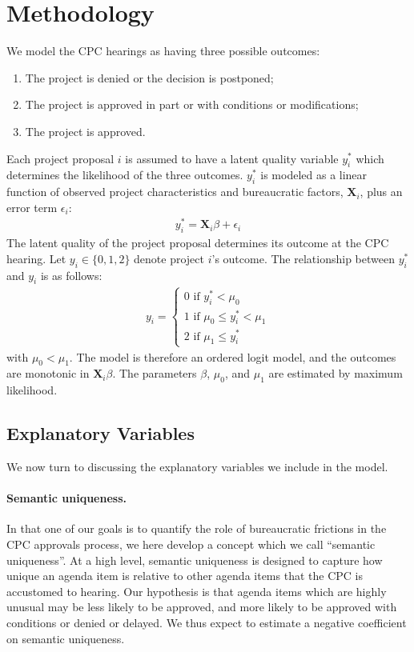 \section{Methodology}\label{sec_methodology}

We model the CPC hearings as having three possible outcomes:
\begin{enumerate}[start=0]
\item The project is denied or the decision is postponed;
\item The project is approved in part or with conditions or modifications;
\item The project is approved.
\end{enumerate}
Each project proposal $i$ is assumed to have a latent quality variable $y_i^\ast$ which determines the likelihood of the three outcomes. $y_i^\ast$ is modeled as a linear function of observed project characteristics and bureaucratic factors, $\mathbf{X}_i$, plus an error term $\epsilon_i$:
\begin{align}
y_i^\ast = \mathbf{X}_i \beta + \epsilon_i
\end{align}
The latent quality of the project proposal determines its outcome at the CPC hearing. Let $y_{i} \in \{0, 1, 2\}$ denote project $i$'s outcome. The relationship between $y_i^\ast$ and $y_i$ is as follows:
\begin{align}
y_i = \begin{cases}
0 \text{ if } y_i^\ast < \mu_0 \\
1 \text{ if } \mu_0 \leq y_i^\ast < \mu_1 \\
2 \text{ if } \mu_1 \leq y_i^\ast
\end{cases}
\end{align}
with $\mu_0 < \mu_1$. The model is therefore an ordered logit model, and the outcomes are monotonic in $\mathbf{X}_i \beta$. The parameters $\beta$, $\mu_0$, and $\mu_1$ are estimated by maximum likelihood.

\subsection{Explanatory Variables}

We now turn to discussing the explanatory variables we include in the model.

\paragraph{Semantic uniqueness.} In that one of our goals is to quantify the role of bureaucratic frictions in the CPC approvals process, we here develop a concept which we call ``semantic uniqueness''. At a high level, semantic uniqueness is designed to capture how unique an agenda item is relative to other agenda items that the CPC is accustomed to hearing. Our hypothesis is that agenda items which are highly unusual may be less likely to be approved, and more likely to be approved with conditions or denied or delayed. We thus expect to estimate a negative coefficient on semantic uniqueness.

